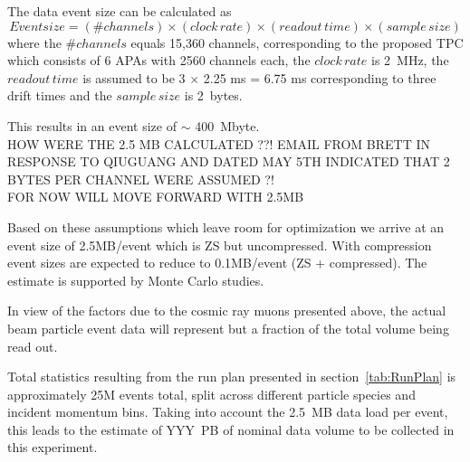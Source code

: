 The data event size can be calculated as
\begin{equation}
  Event size = (\#channels) \times (clock\, rate) \times (readout \, time) \times (sample \, size)
\end{equation}
where the $\# channels$ equals 15,360 channels, corresponding to the proposed TPC which consists of 6 APAs with 2560 channels each, 
the $clock \, rate$ is 2~MHz, the $readout \, time$ is assumed to be 3 $ \times $ 2.25 ms = 6.75 ms corresponding to three drift times and the $sample \, size$ is 2~bytes.

{\color{red} This results in an event size of $\sim$ 400~Mbyte.\\
HOW WERE THE 2.5 MB CALCULATED ??! EMAIL FROM BRETT IN RESPONSE TO QIUGUANG AND DATED MAY 5TH INDICATED THAT 2 BYTES PER CHANNEL WERE ASSUMED ?!\\
FOR NOW WILL MOVE FORWARD WITH 2.5MB\\}
%

Based on these assumptions which leave room for optimization
we arrive at an event size of 2.5MB/event which is ZS but uncompressed.
With compression event sizes are expected to reduce to 0.1MB/event (ZS + compressed).
%
%
The estimate is supported by Monte Carlo studies.


In view of the factors due to the cosmic ray muons presented above, the actual beam particle event data will represent but a fraction of
the total volume being read out.  

Total statistics resulting from the run plan presented in section~\ref{tab:RunPlan} is approximately 25M events total, 
split across different particle species and incident momentum bins. Taking into account the 2.5~MB data load per event, 
this leads to the estimate of YYY~PB of nominal data volume to be collected in this experiment. 

